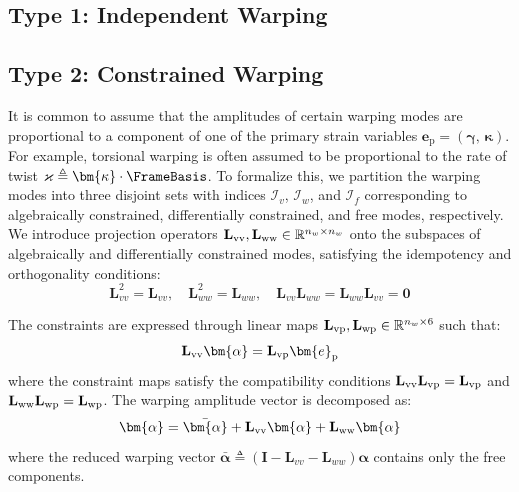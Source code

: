 
\subsection{Type 1: Independent Warping}


\subsection{Type 2: Constrained Warping}

It is common to assume that the amplitudes of certain warping modes are proportional to a component of one of the primary strain variables \(\bm{e}_{\mathrm{p}} = (\bm{\gamma},\,\bm{\kappa})\). 
For example, torsional warping is often assumed to be proportional to the rate of twist \(\varkappa \triangleq \bm{\kappa}\cdot \FrameBasis\).
To formalize this, we partition the warping modes into three disjoint sets with indices \(\mathcal{I}_v\), \(\mathcal{I}_w\), and \(\mathcal{I}_f\) corresponding to algebraically constrained, differentially constrained, and free modes, respectively. 
We introduce projection operators \(\mathbf{L}_{\rm vv}, \mathbf{L}_{\rm ww} \in \mathbb{R}^{n_w \times n_w}\) onto the subspaces of algebraically and differentially constrained modes, satisfying the idempotency and orthogonality conditions:
\[
\mathbf{L}_{vv}^2 = \mathbf{L}_{vv}, \quad \mathbf{L}_{ww}^2 = \mathbf{L}_{ww}, \quad \mathbf{L}_{vv}\mathbf{L}_{ww} = \mathbf{L}_{ww}\mathbf{L}_{vv} = \mathbf{0}
\]

The constraints are expressed through linear maps \(\mathbf{L}_{\rm vp}, \mathbf{L}_{\rm wp} \in \mathbb{R}^{n_w \times 6}\) such that:
%
\begin{equation}
\left.
\begin{aligned}
\mathbf{L}_{\rm vv}\bm{\alpha} &= \mathbf{L}_{\rm vp}\bm{e}_{\mathrm{p}} \\
\end{aligned}\right.
\label{eq:linear-warp-constraints}
\end{equation}
%
where the constraint maps satisfy the compatibility conditions \(\mathbf{L}_{\rm vv}\mathbf{L}_{\rm vp} = \mathbf{L}_{\rm vp}\) and \(\mathbf{L}_{\rm ww}\mathbf{L}_{\rm wp} = \mathbf{L}_{\rm wp}\). 
%
The warping amplitude vector is decomposed as:
\begin{equation}
\bm{\alpha} = \bar{\bm{\alpha}} + \mathbf{L}_{\rm vv}\bm{\alpha} + \mathbf{L}_{\rm ww}\bm{\alpha}
\label{eq:decompose-alpha}
\end{equation}
where the reduced warping vector \(\bar{\bm{\alpha}} \triangleq (\mathbf{I} - \mathbf{L}_{vv} - \mathbf{L}_{ww})\bm{\alpha}\) contains only the free components.

